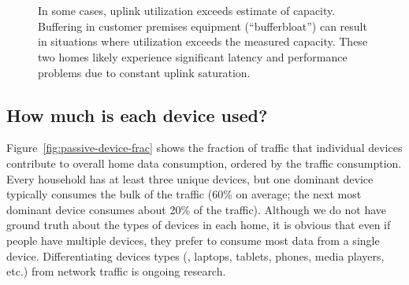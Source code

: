 \begin{figure}[t]
  \begin{minipage}{\linewidth}
  \\
  \\
  \caption{In some cases, uplink utilization exceeds estimate of
    capacity.  Buffering in customer premises equipment
    (``bufferbloat'') can result in situations where utilization exceeds
  the measured capacity.  These two homes likely experience significant
  latency and performance problems due to constant uplink saturation.}
  \label{fig:over-util-uplink}
  \end{minipage}
\end{figure}

\subsection{How much is each device used?}\label{sec:device-dist}
Figure~\ref{fig:passive-device-frac} shows the fraction
of traffic that individual devices contribute to overall
home data consumption, ordered by the traffic consumption.
Every household has at least three unique devices, but
 one dominant device typically consumes the bulk of 
the traffic (60\% on average; the next most dominant device consumes
about 20\% of the traffic).
Although we do not have ground truth about the types of devices in
each home, it is obvious that even if people have
multiple devices, they prefer to consume most data from
a single device.
Differentiating devices types (\eg, laptops, tablets,
phones, media players, etc.) from network traffic
is ongoing research.

